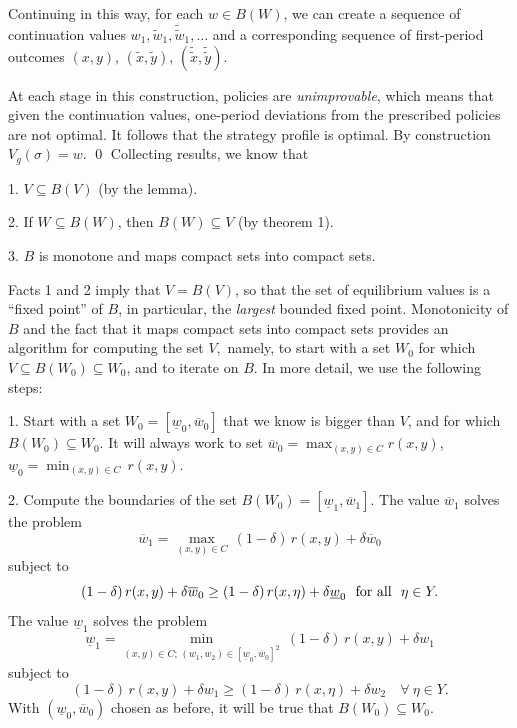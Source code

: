 Continuing in this way, for each $w\in B(W)$, we can create a sequence of
continuation values $w_1,\tilde w_1, \tilde {\tilde w}_1,\ldots$ and a
corresponding sequence of first-period outcomes
 $(x,y),\, (\tilde x,\tilde y),\,
(\tilde {\tilde x}, \tilde{\tilde y})$.

At each stage in this construction, policies are {\it unimprovable}, which
means that given the continuation values, one-period deviations from the
prescribed policies are not optimal.  It follows that the strategy profile is
optimal.  By construction $V_g(\sigma) = w$.
\qed
{}%
\newpage
Collecting results, we know that
\medskip
\item{1.} $V\subseteq B(V)$ (by the lemma).
\smallskip
\item{2.} If $W\subseteq B(W)$, then $B(W) \subseteq V$ (by theorem 1).
\smallskip
\item{3.}  $B$ is monotone and maps compact sets into compact sets.
\medskip

\noindent Facts 1 and 2 imply that $V=B(V)$, so that the set of
equilibrium values is a ``fixed point''
 of $B$, in particular, the {\it largest\/} bounded fixed
 point.
  Monotonicity of $B$ and the
fact that it maps compact sets into compact sets provides an
algorithm for computing the set $V,$ namely, to start with a set
$W_0$ for which $V \subseteq B(W_0)  \subseteq W_0$,  and to iterate
 on $B$. In more detail, we use
the following steps:
\medskip

\item{1.}  Start with a set $W_0 = [\underline{w}_0,\overline w_0]$ that
we know is bigger than $V$, and for which
$B(W_0) \subseteq W_0$.  It will always work to set $\overline w_0 =
\max_{(x,y)\in C}
 r(x,y)$, $\underline{w}_0=\min_{(x,y)\in C} \, r(x,y)$.
\medskip

\item{2.}  Compute the boundaries of the set $B(W_0) = [\underline{w}_1,
\overline w_1]$.  The value $\overline w_1$ solves the problem
$$\overline w_1 = \max_{(x,y)\in C}\, (1-\delta)\, r(x,y) + \delta
\overline w_0$$
subject to
$$(1-\delta)\, r(x,y) + \delta \overline w_0\geq (1-\delta)\, r(x,\eta) +
\delta \underline{w}_0\ \hbox{ for all }\ \eta \in Y.$$
The value $\underline{w}_1$ solves the problem
$$\underline{w}_1 = \min_{(x,y)\in C;\, (w_1,w_2)\in
[\underline{w}_0,\overline w_0]^2}\
(1-\delta)\, r(x,y) + \delta w_1$$
subject to
$$(1-\delta)\, r(x,y) + \delta w_1 \geq (1-\delta)\, r(x,\eta) + \delta
w_2\quad\forall\ \eta\in Y.$$
With $(\underline w_0, \overline w_0)$ chosen as before, it will be
true that $B(W_0) \subseteq W_0$.
\medskip

